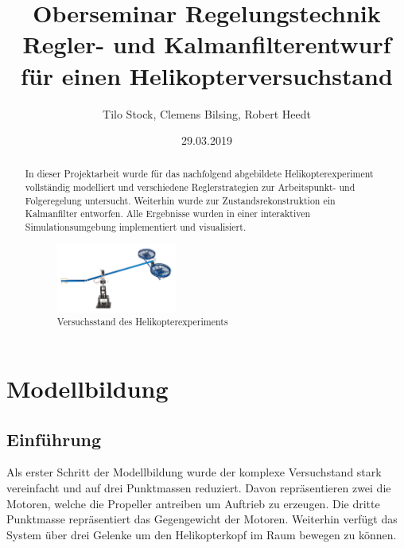 \documentclass[times, 9pt,twocolumn]{article}
\begin{document}
	\title{Oberseminar Regelungstechnik \\ Regler- und Kalmanfilterentwurf f\"ur einen 					Helikopterversuchstand}
	\author{Tilo Stock, Clemens Bilsing, Robert Heedt}
	\date {29.03.2019}

	\maketitle
	\thispagestyle{empty}
	
	\renewcommand\abstractname{Zusammenfassung}
	\begin{abstract}
		In dieser Projektarbeit wurde für das nachfolgend abgebildete Helikopterexperiment vollständig modelliert und verschiedene Reglerstrategien zur Arbeitspunkt- und Folgeregelung untersucht. Weiterhin wurde zur Zustandsrekonstruktion ein Kalmanfilter entworfen. Alle Ergebnisse wurden in einer interaktiven Simulationsumgebung implementiert und visualisiert.

		\begin{figure}[ht]
			\centering
			\includegraphics[width=0.4\textwidth]{images/Versuchstand}
			\caption{Versuchsstand des Helikopterexperiments}
			\label{Versuchstand}
		\end{figure}
	\end{abstract}
	
	\section{Modellbildung}
	\subsection{Einführung}

	Als erster Schritt der Modellbildung wurde der komplexe Versuchstand stark vereinfacht und auf drei Punktmassen reduziert. Davon repräsentieren zwei die Motoren, welche die Propeller antreiben um Auftrieb zu erzeugen. Die dritte Punktmasse repräsentiert das Gegengewicht der Motoren. Weiterhin verfügt das System über drei Gelenke um den Helikopterkopf im Raum bewegen zu können.
\end{document}
